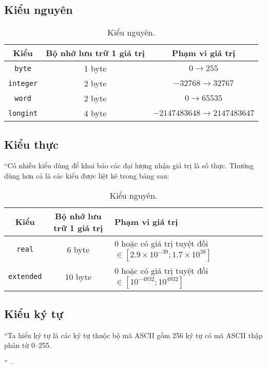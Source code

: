 \documentclass[oneside]{book}
\numberwithin{equation}{section}
\begin{document}
\subsection{Kiểu nguyên}

\begin{table}[H]
	\centering
	\begin{tabular}{|c|c|c|}
		\hline
		\textbf{Kiểu} & \textbf{Bộ nhớ lưu trữ 1 giá trị} & \textbf{Phạm vi giá trị} \\
		\hline
		\texttt{byte} & 1 byte & $0\to255$ \\
		\hline
		\texttt{integer} & 2 byte & $-32768\to32767$ \\
		\hline
		\texttt{word} & 2 byte & $0\to65535$ \\
		\hline
		\texttt{longint} & 4 byte & $-2147483648\to2147483647$ \\
		\hline
	\end{tabular}
	\caption{Kiểu nguyên.}
\end{table}

\subsection{Kiểu thực}
``Có nhiều kiểu dùng để khai báo các đại lượng nhận giá trị là số thực. Thường dùng hơn cả là các kiểu được liệt kê trong bảng sau:

\begin{table}[H]
	\centering
	\begin{tabular}{|c|c|l|}
		\hline
		\textbf{Kiểu} & \textbf{Bộ nhớ lưu trữ 1 giá trị} & \textbf{Phạm vi giá trị} \\
		\hline
		\texttt{real} & 6 byte & $0$ hoặc có giá trị tuyệt đối $\in[2.9\times 10^{-39};1.7\times 10^{38}]$ \\
		\hline
		\texttt{extended} & 10 byte & $0$ hoặc có giá trị tuyệt đối $\in[10^{-4932};10^{4932}]$ \\
		\hline
	\end{tabular}
	\caption{Kiểu nguyên.}
\end{table}

\subsection{Kiểu ký tự}
``Ta hiểu ký tự là các ký tự thuộc bộ mã ASCII gồm 256 ký tự có mã ASCII thập phân từ 0--255.

'' -- \cite[p. 22]{SGK_Tin_Hoc_11}

\end{document}
